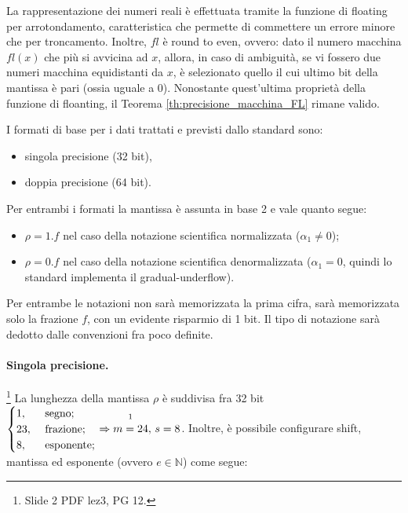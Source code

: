 La rappresentazione dei numeri reali è effettuata tramite la funzione di floating per arrotondamento, caratteristica che permette di commettere un errore minore che per troncamento. Inoltre, $fl$ è round to even, ovvero: dato il numero macchina $fl(x)$ che più si avvicina ad $x$, allora, in caso di ambiguità, se vi fossero due numeri macchina equidistanti da $x$, è selezionato quello il cui ultimo bit della mantissa è pari (ossia uguale a 0). Nonostante quest'ultima proprietà della funzione di floanting, il Teorema \ref{th:precisione_macchina_FL} rimane valido. 

I formati di base per i dati trattati e previsti dallo standard sono:
\begin{itemize}
	\item singola precisione (32 bit),
	\item doppia precisione (64 bit).
\end{itemize}

Per entrambi i formati la mantissa è assunta in base 2 e vale quanto segue:
\begin{itemize}
	\item $\rho=1.f$ nel caso della notazione scientifica normalizzata ($\alpha_1\neq 0$);
	\item $\rho=0.f$ nel caso della notazione scientifica denormalizzata ($\alpha_1=0$, quindi lo standard implementa il gradual-underflow).
\end{itemize}

Per entrambe le notazioni non sarà memorizzata la prima cifra, sarà memorizzata solo la frazione $f$, con un evidente risparmio di 1 bit. Il tipo di notazione sarà dedotto dalle convenzioni fra poco definite.

\paragraph{Singola precisione.}\footnote{Slide 2 PDF lez3, PG 12.}
La lunghezza della mantissa $\rho$ è suddivisa fra 32 bit $\begin{cases}
	1, &\text{ segno};\\
	23, &\text{ frazione};\\
	8, &\text{ esponente};
\end{cases}\Rightarrow \overset{\footnotemark}{m=24},\, s=8$. Inoltre, è possibile configurare shift, mantissa ed esponente (ovvero $e\in\mathbb N$) come segue:

